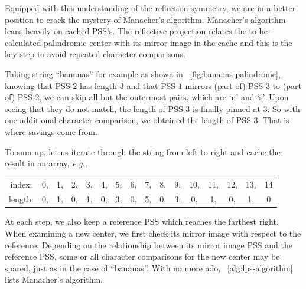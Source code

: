Equipped with this understanding of the reflection symmetry, we are in a better position to
crack the mystery of Manacher's algorithm.
Manacher's algorithm leans heavily on cached PSS's.
The reflective projection relates the to-be-calculated palindromic center with its mirror image in
the cache and this is the key step to avoid repeated character comparisons.

Taking string ``bananas'' for example as shown in ~\autoref{fig:bananas-palindrome},
knowing that PSS-$2$ has length $3$ and that PSS-$1$ mirrors (part of) PSS-$3$ to (part of)
PSS-$2$, we can skip all but the outermost pairs, which are `n' and `s'.
Upon seeing that they do not match, the length of PSS-$3$ is finally pinned at $3$.
So with one additional character comparison, we obtained the length of PSS-$3$.
That is where savings come from.


To sum up, let us iterate through the string from left to right and cache the result in an array,
\textit{e.g.},
\begin{center}
    \begin{tabular}{cccccccccccccccc}
        index:&0,&1,&2,&3,&4,&5,&6,&7,&8,&9,&10,&11,&12,&13,&14\\
        length:&0,&1,&0,&1,&0,&3,&0,&5,&0,&3,&0,&1,&0,&1,&0
    \end{tabular}
\end{center}
At each step, we also keep a reference PSS which reaches the farthest right.
When examining a new center, we first check its mirror image with respect to the
reference.
Depending on the relationship between its mirror image PSS and the reference PSS,
some or all character comparisons for the new center may be spared, just as in the case of
``bananas''.
With no more ado, ~\autoref{alg:lps-algorithm} lists Manacher's algorithm.

